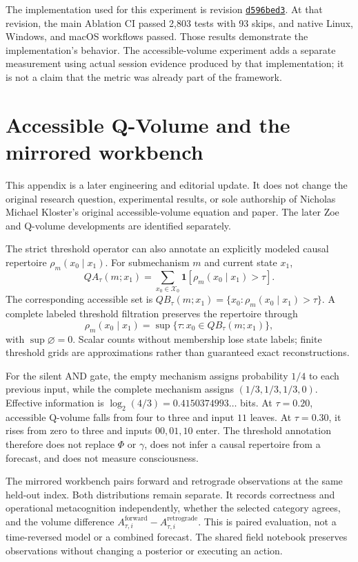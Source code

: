 \documentclass[11pt,a4paper]{article}
\begin{document}
The implementation used for this experiment is revision \href{https://github.com/Ablation-Tool/ablation/commit/d596bed31ba5fe361efa1c6fdad6d86e3126ab63}{\texttt{d596bed3}}. At that revision, the main Ablation CI passed 2,803 tests with 93 skips, and native Linux, Windows, and macOS workflows passed. Those results demonstrate the implementation's behavior. The accessible-volume experiment adds a separate measurement using actual session evidence produced by that implementation; it is not a claim that the metric was already part of the framework.

\section{Accessible Q-Volume and the mirrored workbench}
This appendix is a later engineering and editorial update. It does not change the original research question, experimental results, or sole authorship of Nicholas Michael Kloster's original accessible-volume equation and paper. The later Zoe and Q-volume developments are identified separately.

The strict threshold operator can also annotate an explicitly modeled causal repertoire $\rho_m(x_0\mid x_1)$. For submechanism $m$ and current state $x_1$,
\begin{equation}
QA_\tau(m;x_1)=\sum_{x_0\in\mathcal X_0}\mathbf 1[\rho_m(x_0\mid x_1)>\tau].
\end{equation}
The corresponding accessible set is $QB_\tau(m;x_1)=\{x_0:\rho_m(x_0\mid x_1)>\tau\}$. A complete labeled threshold filtration preserves the repertoire through
\begin{equation}
\rho_m(x_0\mid x_1)=\sup\{\tau:x_0\in QB_\tau(m;x_1)\},
\end{equation}
with $\sup\varnothing=0$. Scalar counts without membership lose state labels; finite threshold grids are approximations rather than guaranteed exact reconstructions.

For the silent AND gate, the empty mechanism assigns probability $1/4$ to each previous input, while the complete mechanism assigns $(1/3,1/3,1/3,0)$. Effective information is $\log_2(4/3)=0.4150374993\ldots$ bits. At $\tau=0.20$, accessible Q-volume falls from four to three and input $11$ leaves. At $\tau=0.30$, it rises from zero to three and inputs $00,01,10$ enter. The threshold annotation therefore does not replace $\Phi$ or $\gamma$, does not infer a causal repertoire from a forecast, and does not measure consciousness.

The mirrored workbench pairs forward and retrograde observations at the same held-out index. Both distributions remain separate. It records correctness and operational metacognition independently, whether the selected category agrees, and the volume difference $A_{\tau,i}^{\mathrm{forward}}-A_{\tau,i}^{\mathrm{retrograde}}$. This is paired evaluation, not a time-reversed model or a combined forecast. The shared field notebook preserves observations without changing a posterior or executing an action.
\end{document}
